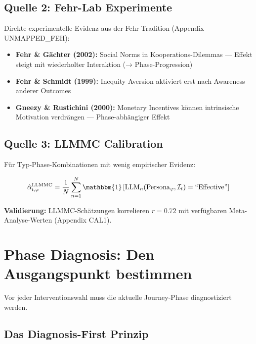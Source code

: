 \subsection{Quelle 2: Fehr-Lab Experimente}

Direkte experimentelle Evidenz aus der Fehr-Tradition (Appendix UNMAPPED_FEH):

\begin{itemize}
\item \textbf{Fehr \& Gächter (2002):} Social Norms in Kooperations-Dilemmas --- Effekt steigt mit wiederholter Interaktion (→ Phase-Progression)
\item \textbf{Fehr \& Schmidt (1999):} Inequity Aversion aktiviert erst nach Awareness anderer Outcomes
\item \textbf{Gneezy \& Rustichini (2000):} Monetary Incentives können intrinsische Motivation verdrängen --- Phase-abhängiger Effekt
\end{itemize}

\subsection{Quelle 3: LLMMC Calibration}

Für Typ-Phase-Kombinationen mit wenig empirischer Evidenz:

\begin{equation}
\hat{\alpha}_{t,\varphi}^{\text{LLMMC}} = \frac{1}{N} \sum_{n=1}^{N} \mathbbm{1}\left[ \text{LLM}_n(\text{Persona}_\varphi, \mathcal{I}_t) = \text{``Effective''} \right]
\label{eq:18-llmmc-alpha}
\end{equation}

\textbf{Validierung:} LLMMC-Schätzungen korrelieren $r = 0.72$ mit verfügbaren Meta-Analyse-Werten (Appendix CAL1).


\section{Phase Diagnosis: Den Ausgangspunkt bestimmen}
\label{sec:18-diagnosis}

Vor jeder Interventionswahl muss die aktuelle Journey-Phase diagnostiziert werden.

\subsection{Das Diagnosis-First Prinzip}

